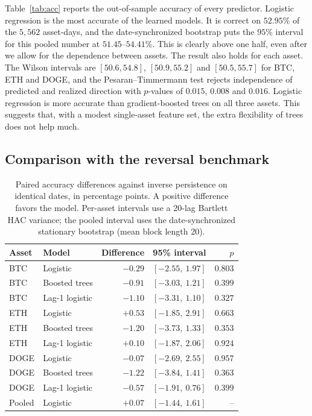 \documentclass[preprint,12pt,authoryear,a4paper]{elsarticle}
\begin{document}
Table~\ref{tab:acc} reports the out-of-sample accuracy of every predictor. Logistic
regression is the most accurate of the learned models. It is correct on $52.95\%$
of the $5{,}562$ asset-days, and the date-synchronized bootstrap puts the $95\%$
interval for this pooled number at $51.45$--$54.41\%$. This is clearly above one
half, even after we allow for the dependence between assets. The result also holds
for each asset. The Wilson intervals are $[50.6, 54.8]$, $[50.9, 55.2]$ and
$[50.5, 55.7]$ for BTC, ETH and DOGE, and the Pesaran--Timmermann test rejects
independence of predicted and realized direction with $p$-values of $0.015$,
$0.008$ and $0.016$. Logistic regression is more accurate than gradient-boosted
trees on all three assets. This suggests that, with a modest single-asset feature
set, the extra flexibility of trees does not help much.

\subsection{Comparison with the reversal benchmark}

\begin{table}[htbp]\centering\small
\caption{Paired accuracy differences against inverse persistence on identical
dates, in percentage points. A positive difference favors the model. Per-asset
intervals use a 20-lag Bartlett HAC variance; the pooled interval uses the
date-synchronized stationary bootstrap (mean block length 20).}
\label{tab:paired}
\begin{tabular}{@{}llrcr@{}}
\toprule
Asset & Model & Difference & 95\% interval & $p$ \\
\midrule
BTC  & Logistic       & $-0.29$ & $[-2.55,\ 1.97]$ & $0.803$ \\
BTC  & Boosted trees  & $-0.91$ & $[-3.03,\ 1.21]$ & $0.399$ \\
BTC  & Lag-1 logistic & $-1.10$ & $[-3.31,\ 1.10]$ & $0.327$ \\
\midrule
ETH  & Logistic       & $+0.53$ & $[-1.85,\ 2.91]$ & $0.663$ \\
ETH  & Boosted trees  & $-1.20$ & $[-3.73,\ 1.33]$ & $0.353$ \\
ETH  & Lag-1 logistic & $+0.10$ & $[-1.87,\ 2.06]$ & $0.924$ \\
\midrule
DOGE & Logistic       & $-0.07$ & $[-2.69,\ 2.55]$ & $0.957$ \\
DOGE & Boosted trees  & $-1.22$ & $[-3.84,\ 1.41]$ & $0.363$ \\
DOGE & Lag-1 logistic & $-0.57$ & $[-1.91,\ 0.76]$ & $0.399$ \\
\midrule
Pooled & Logistic     & $+0.07$ & $[-1.44,\ 1.61]$ & -- \\
\bottomrule
\end{tabular}
\end{table}
\end{document}
